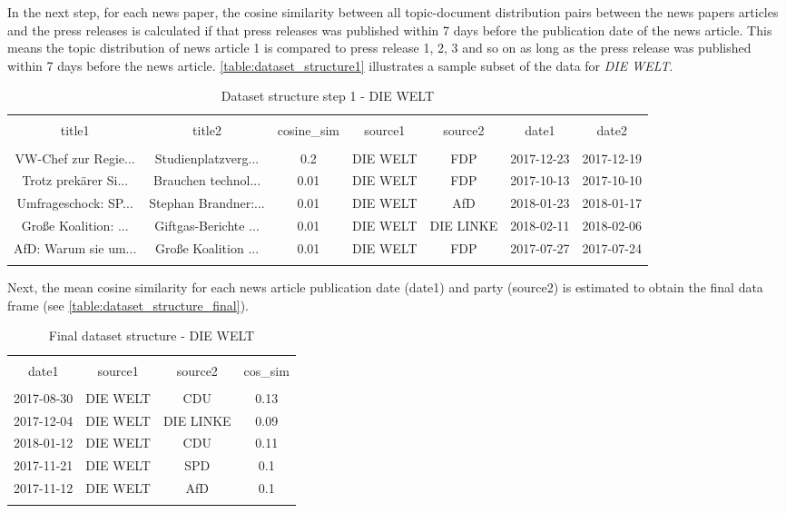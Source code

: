 \documentclass[
]{article}
\begin{document}
In the next step, for each news paper, the cosine similarity between all
topic-document distribution pairs between the news papers articles and
the press releases is calculated if that press releases was published
within 7 days before the publication date of the news article. This
means the topic distribution of news article 1 is compared to press
release 1, 2, 3 and so on as long as the press release was published
within 7 days before the news article.
\autoref{table:dataset_structure1} illustrates a sample subset of the
data for \emph{DIE WELT}.

\begin{table}[!htbp] \centering 
  \caption{Dataset structure step 1 - DIE WELT} 
  \label{table:dataset_structure1} 
\tiny 
\begin{tabular}{@{\extracolsep{5pt}} ccccccc} 
\\[-1.8ex]\hline 
\hline \\[-1.8ex] 
title1 & title2 & cosine\_sim & source1 & source2 & date1 & date2 \\ 
\hline \\[-1.8ex] 
VW-Chef zur Regie... &  Studienplatzverg... & 0.2 & DIE WELT & FDP & 2017-12-23 & 2017-12-19 \\ 
Trotz prekärer Si... &  Brauchen technol... & 0.01 & DIE WELT & FDP & 2017-10-13 & 2017-10-10 \\ 
Umfrageschock: SP... & Stephan Brandner:... & 0.01 & DIE WELT & AfD & 2018-01-23 & 2018-01-17 \\ 
Große Koalition: ... & Giftgas-Berichte ... & 0.01 & DIE WELT & DIE LINKE & 2018-02-11 & 2018-02-06 \\ 
AfD: Warum sie um... &  Große Koalition ... & 0.01 & DIE WELT & FDP & 2017-07-27 & 2017-07-24 \\ 
\hline \\[-1.8ex] 
\end{tabular} 
\end{table}

Next, the mean cosine similarity for each news article publication date
(date1) and party (source2) is estimated to obtain the final data frame
(see \autoref{table:dataset_structure_final}).

\begin{table}[!htbp] \centering 
  \caption{Final dataset structure - DIE WELT} 
  \label{table:dataset_structure_final} 
\tiny 
\begin{tabular}{@{\extracolsep{5pt}} cccc} 
\\[-1.8ex]\hline 
\hline \\[-1.8ex] 
date1 & source1 & source2 & cos\_sim \\ 
\hline \\[-1.8ex] 
2017-08-30 & DIE WELT & CDU & 0.13 \\ 
2017-12-04 & DIE WELT & DIE LINKE & 0.09 \\ 
2018-01-12 & DIE WELT & CDU & 0.11 \\ 
2017-11-21 & DIE WELT & SPD & 0.1 \\ 
2017-11-12 & DIE WELT & AfD & 0.1 \\ 
\hline \\[-1.8ex] 
\end{tabular} 
\end{table}
\end{document}
